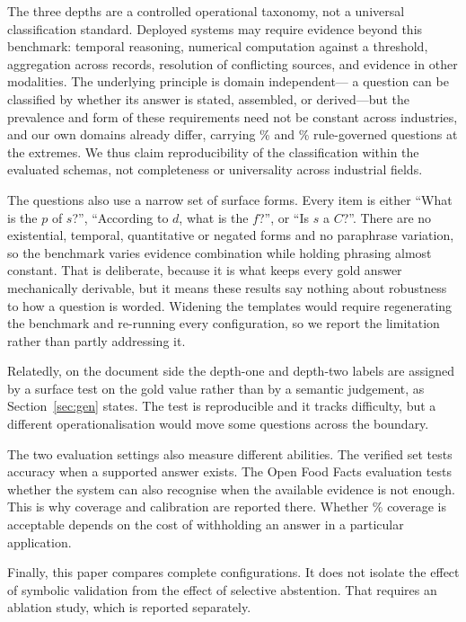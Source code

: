 \documentclass[conference]{IEEEtran}
\begin{document}
The three depths are a controlled operational taxonomy, not a universal
classification standard. Deployed systems may require evidence beyond this
benchmark: temporal reasoning, numerical computation against a
threshold, aggregation across records, resolution of conflicting sources, and
evidence in other modalities. The underlying principle is domain independent---
a question can be classified by whether its answer is stated, assembled, or
derived---but the prevalence and form of these requirements need not be
constant across industries, and our own domains already differ, carrying
\ShareMostRule\% and \ShareLeastRule\% rule-governed questions at the extremes.
We thus claim reproducibility of the classification within the evaluated
schemas, not completeness or universality across industrial fields.

The questions also use a narrow set of surface forms. Every item is either
``What is the $p$ of $s$?'', ``According to $d$, what is the $f$?'', or ``Is $s$
a $C$?''. There are no existential, temporal, quantitative or negated forms and
no paraphrase variation, so the benchmark varies evidence combination while
holding phrasing almost constant. That is deliberate, because it is what keeps
every gold answer mechanically derivable, but it means these results say nothing
about robustness to how a question is worded. Widening the templates would
require regenerating the benchmark and re-running every configuration, so we
report the limitation rather than partly addressing it.

Relatedly, on the document side the depth-one and depth-two labels are
assigned by a surface test on the gold value rather than by a semantic
judgement, as Section~\ref{sec:gen} states. The test is reproducible and it
tracks difficulty, but a different operationalisation would move some questions
across the boundary.

The two evaluation settings also measure different abilities. The verified set
tests accuracy when a supported answer exists. The Open Food Facts evaluation
tests whether the system can also recognise when the available evidence is not
enough. This is why coverage and calibration are reported there. Whether
\OffCoverage\% coverage is acceptable depends on the cost of withholding an
answer in a particular application.

Finally, this paper compares complete configurations. It does not isolate the
effect of symbolic validation from the effect of selective abstention. That
requires an ablation study, which is reported separately.
\end{document}
